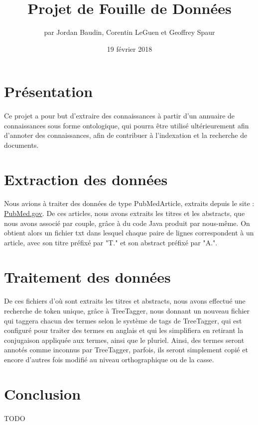 \documentclass{article}
\title{Projet de Fouille de Données}
\author{par Jordan Baudin, Corentin LeGuen et Geoffrey Spaur}
\date{19 février 2018}
\begin{document}
\maketitle
\newpage
\tableofcontents{}
\newpage
\section{Présentation}
  \paragraph{}
  Ce projet a pour but d'extraire des connaissances à partir d'un annuaire de connaissances sous forme ontologique,
  qui pourra être utilisé ultérieurement afin d'annoter des connaissances, afin de contribuer à l'indexation et la recherche
  de documents.
  
 \newpage
\section{Extraction des données}
\paragraph{}
  Nous avions à traiter des données de type PubMedArticle, 
  extraits depuis le site : \href{https://www.ncbi.nlm.nih.gov/pubmed}{PubMed.gov}.
  De ces articles, nous avons extraits les titres et les abstracts, que nous avons associé par couple, grâce à du code Java produit par nous-même.
  On obtient alors un fichier txt dans lesquel chaque paire de lignes correspondent à un article,
  avec son titre préfixé par "T." et son abstract préfixé par "A.".

\section{Traitement des données}
\paragraph{}
  De ces fichiers d'où sont extraits les titres et abstracts, nous avons effectué une recherche de token unique,
  grâce à TreeTagger, nous donnant un nouveau fichier qui taggera chacun des termes selon le système de tags de TreeTagger,
  qui est configuré pour traiter des termes en anglais et qui les simplifiera en retirant la conjugaison appliquée aux termes,
  ainsi que le pluriel. Ainsi, des termes seront annotés comme inconnus par TreeTagger, parfois, ils seront simplement copié
  et encore d'autres fois modifié au niveau orthographique ou de la casse.



\newpage
\section{Conclusion}
  \paragraph{} TODO
   
\end{document}
